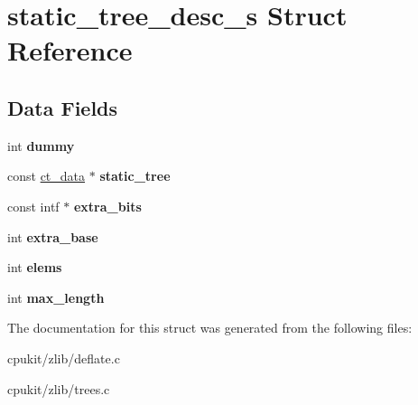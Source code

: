 \hypertarget{structstatic__tree__desc__s}{}\section{static\+\_\+tree\+\_\+desc\+\_\+s Struct Reference}
\label{structstatic__tree__desc__s}
\subsection*{Data Fields}
\begin{DoxyCompactItemize}
\item 
\mbox{\label{structstatic__tree__desc__s_aa3662e0ed40c86de246851a7a2483308}} 
int {\bfseries dummy}
\item 
\mbox{\label{structstatic__tree__desc__s_a56265073858de4ffe99e32d0f9d38545}} 
const \mbox{\hyperlink{structct__data}{ct\+\_\+data}} $\ast$ {\bfseries static\+\_\+tree}
\item 
\mbox{\label{structstatic__tree__desc__s_a4ec9abd624cbf2bfcc48dfb786925986}} 
const intf $\ast$ {\bfseries extra\+\_\+bits}
\item 
\mbox{\label{structstatic__tree__desc__s_a1051cc83d9d410ccf21427df9bd85201}} 
int {\bfseries extra\+\_\+base}
\item 
\mbox{\label{structstatic__tree__desc__s_ab4bad1c091188c43413a09f626a5787f}} 
int {\bfseries elems}
\item 
\mbox{\label{structstatic__tree__desc__s_ae767848725194f63fa9cf08142767ad4}} 
int {\bfseries max\+\_\+length}
\end{DoxyCompactItemize}


The documentation for this struct was generated from the following files\+:\begin{DoxyCompactItemize}
\item 
cpukit/zlib/deflate.\+c\item 
cpukit/zlib/trees.\+c\end{DoxyCompactItemize}

